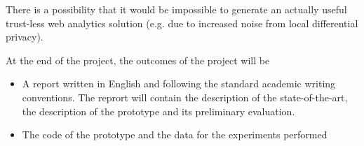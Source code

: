 \documentclass[a4paper]{article}
\begin{document}
\begin{description}[style=nextline]
    \item[Risks] There is a possibility that it would be impossible to generate 
an actually useful trust-less web analytics solution (e.g. due to increased 
noise from local differential privacy).

\item[Outcomes]
At the end of the project, the outcomes of the project will be
\begin{itemize}
\item A report written in English and following the standard academic writing
    conventions. The reprort will contain the description of the 
state-of-the-art, the description of the prototype and its preliminary 
evaluation.
\item The code of the prototype and the data for the experiments performed
\end{itemize}
   
\end{description}

\printbibliography
\end{document}
